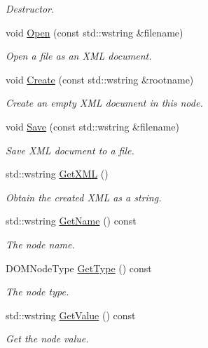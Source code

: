 \begin{DoxyCompactItemize}
\begin{DoxyCompactList}\small\item\em Destructor. \end{DoxyCompactList}\item 
void \hyperlink{classxmlnode_1_1_c_xml_node_abfd7b791490e58aac7091b78e36bd24b}{Open} (const std\+::wstring \&filename)
\begin{DoxyCompactList}\small\item\em Open a file as an X\+M\+L document. \end{DoxyCompactList}\item 
void \hyperlink{classxmlnode_1_1_c_xml_node_a7f4a7dee5a7de490507b9d0ed78dbab7}{Create} (const std\+::wstring \&rootname)
\begin{DoxyCompactList}\small\item\em Create an empty X\+M\+L document in this node. \end{DoxyCompactList}\item 
void \hyperlink{classxmlnode_1_1_c_xml_node_a0f83eef381fe59726503e0fcb854661d}{Save} (const std\+::wstring \&filename)
\begin{DoxyCompactList}\small\item\em Save X\+M\+L document to a file. \end{DoxyCompactList}\item 
std\+::wstring \hyperlink{classxmlnode_1_1_c_xml_node_a700c3de386529eab05b185c38b17fd51}{Get\+X\+M\+L} ()
\begin{DoxyCompactList}\small\item\em Obtain the created X\+M\+L as a string. \end{DoxyCompactList}\item 
std\+::wstring \hyperlink{classxmlnode_1_1_c_xml_node_a90fbe5f25e67b82a0d3caf7bb5d46791}{Get\+Name} () const 
\begin{DoxyCompactList}\small\item\em The node name. \end{DoxyCompactList}\item 
D\+O\+M\+Node\+Type \hyperlink{classxmlnode_1_1_c_xml_node_a85b513f8617fb75a721c646b62be95ab}{Get\+Type} () const 
\begin{DoxyCompactList}\small\item\em The node type. \end{DoxyCompactList}\item 
std\+::wstring \hyperlink{classxmlnode_1_1_c_xml_node_a383ef3eb35e61fc6a5a8889ed67f2a33}{Get\+Value} () const 
\begin{DoxyCompactList}\small\item\em Get the node value. \end{DoxyCompactList}\item 

\end{DoxyCompactItemize}
